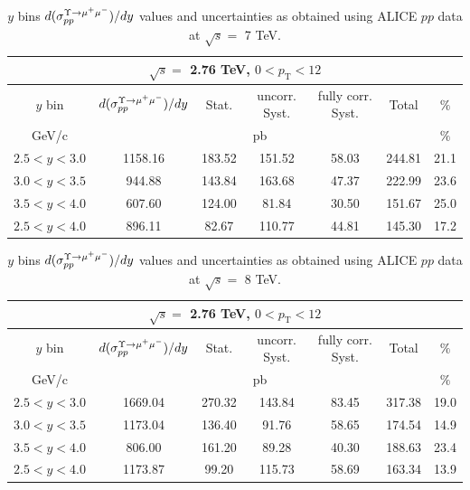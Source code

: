 \begin{table}[!tp]
\begin{center}
\begin{tabular}{|c||c|c|c|c|c|c|}
  \hline
  \multicolumn{7}{|c|}{$\sqrt{s}=$ 2.76 TeV, $0<p_\mathrm{T}<12$}\\
  \hline
  $y$ bin & $d(\sigma_{pp}^{\Upsilon\rightarrow \mu^{+}\mu^{\--}})/dy $ & Stat. & uncorr. Syst. & fully corr. Syst. & Total & $\%$ \\
  \hline
  GeV/c & \multicolumn{5}{c|}{pb} & $\%$ \\
  \hline
  $2.5 < y < 3.0 $ & 1158.16 & 183.52 & 151.52 & 58.03 & 244.81 & 21.1 \\
  \hline
  $3.0 < y < 3.5 $& 944.88 & 143.84 & 163.68 & 47.37 & 222.99 & 23.6 \\
  \hline
  $3.5 < y < 4.0 $& 607.60 & 124.00 & 81.84 & 30.50 & 151.67 & 25.0 \\
  \hline
  $2.5 < y < 4.0 $& 896.11 & 82.67 & 110.77 & 44.81 & 145.30 & 17.2 \\
  \hline
\end{tabular}
\caption{$y$ bins $d(\sigma_{pp}^{\Upsilon\rightarrow \mu^{+}\mu^{\--}})/dy $ values and uncertainties as obtained using ALICE $pp$ data at $\sqrt{s}=$ 7 TeV.}\label{table:ALICEY1sData7}
\end{center}
\end{table}

\begin{table}[!tp]
\begin{center}
\begin{tabular}{|c||c|c|c|c|c|c|}
  \hline
  \multicolumn{7}{|c|}{$\sqrt{s}=$ 2.76 TeV, $0<p_\mathrm{T}<12$}\\
  \hline
  $y$ bin & $d(\sigma_{pp}^{\Upsilon\rightarrow \mu^{+}\mu^{\--}})/dy $ & Stat. & uncorr. Syst. & fully corr. Syst. & Total & $\%$ \\
  \hline
  GeV/c & \multicolumn{5}{c|}{pb} & $\%$ \\
  \hline
  $2.5 < y < 3.0 $ & 1669.04 & 270.32 & 143.84 & 83.45 & 317.38 & 19.0 \\
  \hline
  $3.0 < y < 3.5 $& 1173.04 & 136.40 & 91.76 & 58.65 & 174.54 & 14.9 \\
  \hline
  $3.5 < y < 4.0 $& 806.00 & 161.20 & 89.28 & 40.30 & 188.63 & 23.4 \\
  \hline
  $2.5 < y < 4.0 $& 1173.87 & 99.20 & 115.73 & 58.69 & 163.34 & 13.9 \\
  \hline
\end{tabular}
\caption{$y$ bins $d(\sigma_{pp}^{\Upsilon\rightarrow \mu^{+}\mu^{\--}})/dy $ values and uncertainties as obtained using ALICE $pp$ data at $\sqrt{s}=$ 8 TeV.}\label{table:ALICEY1sData8}
\end{center}
\end{table}

